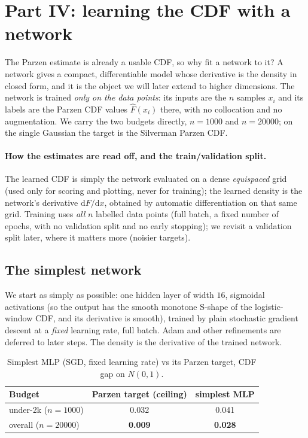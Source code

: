 \documentclass[11pt]{article}
\newcommand{\Fhat}{\widehat{F}}
\begin{document}
\section{Part IV: learning the CDF with a network}

The Parzen estimate is already a usable CDF, so why fit a network to it? A network gives a compact,
differentiable model whose derivative is the density in closed form, and it is the object we will
later extend to higher dimensions. The network is trained \emph{only on the data points}: its inputs
are the $n$ samples $x_i$ and its labels are the Parzen CDF values $\Fhat(x_i)$ there, with no
collocation and no augmentation. We carry the two budgets directly, $n=1000$ and $n=20000$; on the
single Gaussian the target is the Silverman Parzen CDF.

\paragraph{How the estimates are read off, and the train/validation split.} The learned CDF is simply
the network evaluated on a dense \emph{equispaced} grid (used only for scoring and plotting, never for
training); the learned density is the network's derivative $\mathrm{d}F/\mathrm{d}x$, obtained by
automatic differentiation on that same grid. Training uses \emph{all} $n$ labelled data points (full
batch, a fixed number of epochs, with no validation split and no early stopping); we revisit a
validation split later, where it matters more (noisier targets).

\subsection{The simplest network}

We start as simply as possible: one hidden layer of width $16$, sigmoidal activations (so the output
has the smooth monotone S-shape of the logistic-window CDF, and its derivative is smooth), trained by
plain stochastic gradient descent at a \emph{fixed} learning rate, full batch. Adam and other
refinements are deferred to later steps. The density is the derivative of the trained network.

\begin{table}[H]
  \centering
  \caption{Simplest MLP (SGD, fixed learning rate) vs its Parzen target, CDF gap on $N(0,1)$.}
  \label{tab:mlp1}
  \begin{tabular}{lcc}
    \toprule
    Budget & Parzen target (ceiling) & simplest MLP \\
    \midrule
    under-2k ($n{=}1000$)  & 0.032 & 0.041 \\
    overall ($n{=}20000$)  & \textbf{0.009} & \textbf{0.028} \\
    \bottomrule
  \end{tabular}
\end{table}
\end{document}
